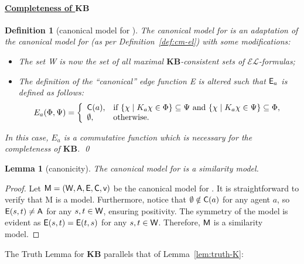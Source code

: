 \documentclass{article}
\newtheorem{definition}[theorem]{Definition}%
\newtheorem{lemma}[theorem]{Lemma}%
\newcommand{\CA}{\textnormal{\sf A}\xspace}
\newcommand{\CC}{\textnormal{\sf C}\xspace}
\newcommand{\CE}{\textnormal{\sf E}\xspace}
\newcommand{\CM}{\textnormal{\sf M}\xspace}
\newcommand{\CV}{\textnormal{\sf v}\xspace}
\newcommand{\CW}{\textnormal{\sf W}\xspace}
\newcommand{\lang}{\ensuremath{\mathcal{EL}}\xspace}
\renewcommand{\l}{\text{\normalfont EL}\xspace}
\newcommand{\ls}{\text{\normalfont EL$^s$}\xspace}
\newcommand{\KB}{\ensuremath{\mathbf{KB}}\xspace}
\begin{document}
\paragraph{\underline{Completeness of \KB}}

\begin{definition}[canonical model for \ls]\label{def:cm-els}
The canonical model for \ls is an adaptation of the canonical model for \l (as per Definition~\ref{def:cm-el}) with some modifications:
\begin{itemize}
\item The set \CW is now the set of all maximal \KB-consistent sets of \lang-formulas;
\item The definition of the ``canonical'' edge function \CE is altered such that $\CE_a$ is defined as follows:
$$E_a(\Phi,\Psi) = \left\{\begin{array}{ll}
	\CC(a), & \text{if $\{\chi\mid K_a\chi\in\Phi\}\subseteq\Psi$ and $\{\chi\mid K_a\chi\in\Psi\}\subseteq\Phi$},\\
	\emptyset, & \text{otherwise.}
\end{array}\right.$$
\end{itemize}
In this case, $E_a$ is a commutative function which is necessary for the completeness of \KB.
\qed
\end{definition}

\begin{lemma}[canonicity]
The canonical model for \ls is a similarity model.
\end{lemma}
\begin{proof}
Let $\CM=(\CW,\CA,\CE,\CC,\CV)$ be the canonical model for \ls. It is straightforward to verify that \CM is a model. Furthermore, notice that $\emptyset \notin \CC(a)$ for any agent $a$, so $\CE(s,t)\neq\CA$ for any $s,t \in \CW$, ensuring positivity. The symmetry of the model is evident as $\CE(s,t)=\CE(t,s)$ for any $s,t \in \CW$. Therefore, $\CM$ is a similarity model.
\end{proof}

The Truth Lemma for \KB parallels that of Lemma~\ref{lem:truth-K}:
\end{document}
